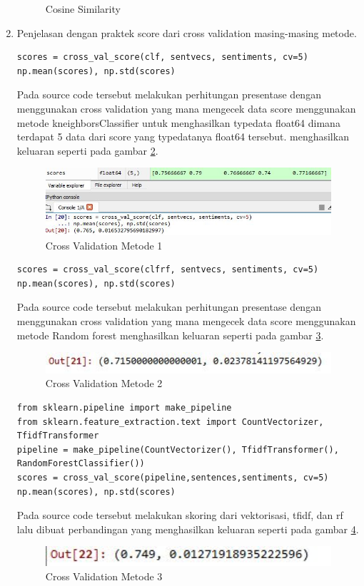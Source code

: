 \begin{enumerate}
\begin{figure}[!htbp]
\caption{Cosine Similarity}
\label{c5_27}
\end{figure}
\item Penjelasan dengan praktek score dari cross validation masing-masing metode.
\begin{verbatim}
scores = cross_val_score(clf, sentvecs, sentiments, cv=5)
np.mean(scores), np.std(scores)
\end{verbatim}
\subitem Pada source code tersebut melakukan perhitungan presentase dengan menggunakan cross validation yang mana mengecek data score menggunakan metode kneighborsClassifier untuk menghasilkan typedata float64 dimana terdapat 5 data dari score yang typedatanya float64 tersebut. menghasilkan keluaran seperti pada gambar \ref{c5_28}.
\begin{figure}[!htbp]
\centerline{\includegraphics[width=1\textwidth]{figures/c5p/28.JPG}}
\caption{Cross Validation Metode 1}
\label{c5_28}
\end{figure}
\begin{verbatim}
scores = cross_val_score(clfrf, sentvecs, sentiments, cv=5)
np.mean(scores), np.std(scores)
\end{verbatim}
\subitem Pada source code tersebut melakukan perhitungan presentase dengan menggunakan cross validation yang mana mengecek data score menggunakan metode Random forest menghasilkan keluaran seperti pada gambar \ref{c5_29}.
\begin{figure}[!htbp]
\centerline{\includegraphics[width=1\textwidth]{figures/c5p/29.JPG}}
\caption{Cross Validation Metode 2}
\label{c5_29}
\end{figure}
\begin{verbatim}
from sklearn.pipeline import make_pipeline
from sklearn.feature_extraction.text import CountVectorizer, TfidfTransformer
pipeline = make_pipeline(CountVectorizer(), TfidfTransformer(), RandomForestClassifier())
scores = cross_val_score(pipeline,sentences,sentiments, cv=5)
np.mean(scores), np.std(scores)
\end{verbatim}
\subitem Pada source code tersebut melakukan skoring dari vektorisasi, tfidf, dan rf lalu dibuat perbandingan yang menghasilkan keluaran seperti pada gambar \ref{c5_30}.
\begin{figure}[!htbp]
\centerline{\includegraphics[width=1\textwidth]{figures/c5p/30.JPG}}
\caption{Cross Validation Metode 3}
\label{c5_30}
\end{figure}
\end{enumerate}

